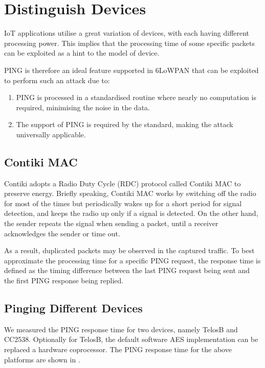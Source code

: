 \section{Distinguish Devices}
IoT applications utilise a great variation of devices, with each having different processing power. This implies that the processing time of some specific packets can be exploited as a hint to the model of device. 

PING is therefore an ideal feature supported in 6LoWPAN that can be exploited to perform such an attack due to:
\begin{enumerate}
	\item PING is processed in a standardised routine where nearly no computation is required, minimising the noise in the data.
	\item The support of PING is required by the standard\cite{rfc4443}, making the attack universally applicable.
\end{enumerate}

\subsection{Contiki MAC}\label{TimingWithContikiMAC}
Contiki adopts a Radio Duty Cycle (RDC) protocol called Contiki MAC\cite{ContikiMAC} to preserve energy. Briefly speaking, Contiki MAC works by switching off the radio for most of the times but periodically wakes up for a short period for signal detection, and keeps the radio up only if a signal is detected. On the other hand, the sender repeats the signal when sending a packet, until a receiver acknowledges the sender or time out.

As a result, duplicated packets may be observed in the captured traffic. To best approximate the processing time for a specific PING request, the response time is defined as the timing difference between the last PING request being sent and the first PING response being replied.

\subsection{Pinging Different Devices}
We measured the PING response time for two devices, namely TelosB\cite{TelosB} and CC2538\cite{CC2538}. Optionally for TelosB, the default software AES implementation can be replaced a hardware coprocessor. The PING response time for the above platforms are shown in .

